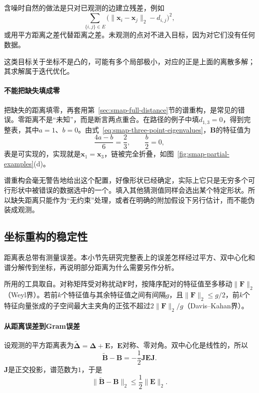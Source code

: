 含噪时自然的做法是只对已观测的边建立残差，例如
\begin{equation}
 \sum_{\{i,j\}\in E}\bigl(\lVert\bm x_i-\bm x_j\rVert_2-d_{i,j}\bigr)^2 ,
 \label{eq:smap-partial-residual}
\end{equation}
或用平方距离之差代替距离之差。未观测的点对不进入目标，因为对它们没有任何数据。

这类目标关于坐标不是凸的，可能有多个局部极小，对应的正是上面的离散多解；其求解属于迭代优化。

\paragraph{不能把缺失填成零}

把缺失的距离填零，再套用第~\ref{sec:smap-full-distance}节的谱重构，是常见的错误。零距离不是“未知”，而是断言两点重合。在路径的例子中填$d_{1,3}=0$，得到完整表，其中$a=1$、$b=0$。由式~\eqref{eq:smap-three-point-eigenvalues}，$\bm B$的特征值为
\[
 \frac{4a-b}6=\frac23,\qquad\frac b2=0,
\]
表是可实现的，实现就是$\bm x_1=\bm x_3$，链被完全折叠，如图~\ref{fig:smap-partial-examples}(d)。

谱重构会毫无警告地给出这个配置，好像形状已经确定，实际上它只是无穷多个可行形状中被错误的数据选中的一个。填入其他猜测值同样会选出某个特定形状。所以缺失距离只能作为“无约束”处理，或者在明确的附加假设下另行估计，而不能伪装成观测。

\subsection{坐标重构的稳定性}
\label{sec:smap-reconstruction-stability}

距离表总带有测量误差。本小节先研究完整表上的误差怎样经过平方、双中心化和谱分解传到坐标，再说明部分距离为什么需要另作分析。

所用的工具取自。对称矩阵受对称扰动$\bm F$时，按降序配对的特征值至多移动$\lVert\bm F\rVert_2$（Weyl界）。若前$k$个特征值与其余特征值之间有间隔$g$，且$\lVert\bm F\rVert_2\leq g/2$，前$k$个特征向量张成的子空间最大主夹角的正弦不超过$2\lVert\bm F\rVert_2/g$（Davis--Kahan界）。

\paragraph{从距离误差到Gram误差}

设观测的平方距离表为$\widetilde{\bm\Delta}=\bm\Delta+\bm E$，$\bm E$对称、零对角。双中心化是线性的，所以
\[
 \widetilde{\bm B}-\bm B=-\frac12\bm J\bm E\bm J .
\]
$\bm J$是正交投影，谱范数为$1$，于是
\begin{equation}
 \lVert\widetilde{\bm B}-\bm B\rVert_2\leq\frac12\lVert\bm E\rVert_2 .
 \label{eq:smap-gram-perturbation}
\end{equation}

